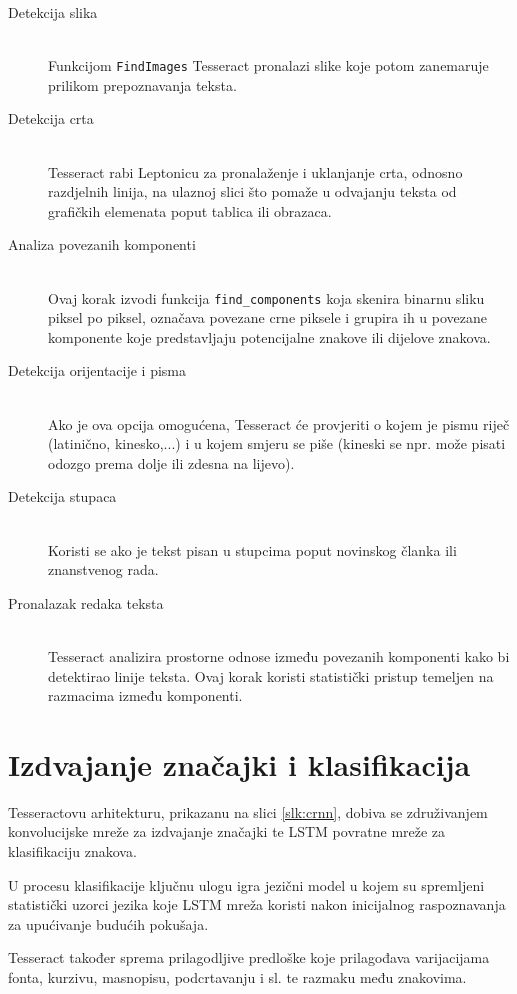 \documentclass[zavrsnirad]{fer}
\begin{document}
\begin{description}
	\item[Detekcija slika] \hfill \\ Funkcijom \texttt{FindImages} Tesseract pronalazi slike koje potom zanemaruje prilikom prepoznavanja teksta.
	\item[Detekcija crta] \hfill \\ Tesseract rabi Leptonicu za pronalaženje i uklanjanje crta, odnosno razdjelnih linija, na ulaznoj slici što pomaže u odvajanju teksta od grafičkih elemenata poput tablica ili obrazaca.
	\item[Analiza povezanih komponenti] \hfill \\ Ovaj korak izvodi funkcija \texttt{find\_components} koja skenira binarnu sliku piksel po piksel, označava povezane crne piksele i grupira ih u povezane komponente koje predstavljaju potencijalne znakove ili dijelove znakova.
	\item[Detekcija orijentacije i pisma] \hfill \\ Ako je ova opcija omogućena, Tesseract će provjeriti o kojem je pismu riječ (latinično, kinesko,...) i u kojem smjeru se piše (kineski se npr. može pisati odozgo prema dolje ili zdesna na lijevo).
	\item[Detekcija stupaca] \hfill \\ Koristi se ako je tekst pisan u stupcima poput novinskog članka ili znanstvenog rada.
	\item[Pronalazak redaka teksta] \hfill \\ Tesseract analizira prostorne odnose između povezanih komponenti kako bi detektirao linije teksta. Ovaj korak koristi statistički pristup temeljen na razmacima između komponenti.
\end{description}

\section{Izdvajanje značajki i klasifikacija}

 Tesseractovu arhitekturu, prikazanu na slici \ref{slk:crnn}, dobiva se združivanjem konvolucijske mreže za izdvajanje značajki te LSTM povratne mreže za klasifikaciju znakova.
 
 U procesu klasifikacije ključnu ulogu igra jezični model u kojem su spremljeni statistički uzorci jezika koje LSTM mreža koristi nakon inicijalnog raspoznavanja za upućivanje budućih pokušaja.
 
 Tesseract također sprema prilagodljive predloške koje prilagođava varijacijama fonta, kurzivu, masnopisu, podcrtavanju i sl. te razmaku među znakovima.
\end{document}
